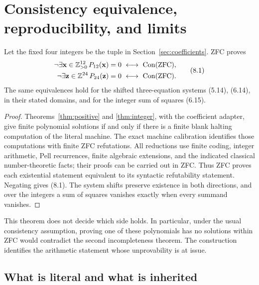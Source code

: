 \section{Consistency equivalence, reproducibility, and limits}
\label{sec:verification}

\begin{theorem}\label{thm:consistency}
Let the fixed four integers be the tuple in
Section~\ref{sec:coefficients}. ZFC proves
\[
\begin{split}
\neg\exists\mathbf x\in\mathbb Z_{>0}^{12}\,
 P_{12}(\mathbf x)=0
&\ \longleftrightarrow\ \operatorname{Con}(\mathrm{ZFC}),\\
\neg\exists\mathbf z\in\mathbb Z^{24}\,
 P_{24}(\mathbf z)=0
&\ \longleftrightarrow\ \operatorname{Con}(\mathrm{ZFC}).
\end{split}
\tag{8.1}
\]
The same equivalences hold for the shifted three-equation
systems (5.14), (6.14), in their stated domains, and for the
integer sum of squares (6.15).
\end{theorem}
\begin{proof}
Theorems~\ref{thm:positive} and \ref{thm:integer}, with the
coefficient adapter, give finite polynomial solutions if and
only if there is a finite blank halting computation of the
literal machine. The exact machine calibration identifies those
computations with finite ZFC refutations.
All reductions use finite coding, integer arithmetic, Pell
recurrences, finite algebraic extensions, and the indicated
classical number-theoretic facts; their proofs can be carried
out in ZFC.
Thus ZFC proves each existential statement equivalent to its
syntactic refutability statement. Negating gives (8.1).
The system shifts preserve existence in both directions,
and over the integers a sum of squares vanishes exactly when
every summand vanishes.
\end{proof}

This theorem does not decide which side holds.
In particular, under the usual consistency assumption, proving
one of these polynomials has no solutions within ZFC would
contradict the second incompleteness theorem.
The construction identifies the arithmetic statement whose
unprovability is at issue.

\subsection{What is literal and what is inherited}

